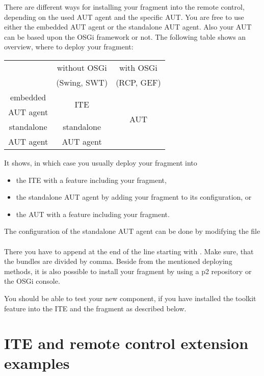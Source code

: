 There are different ways for installing your fragment into the remote
control, depending on the used AUT agent and the specific AUT. You are free to
use either the embedded AUT agent or the standalone AUT agent. Also your AUT
can be based upon the OSGi framework or not. The following table shows an
overview, where to deploy your fragment:

\begin{center}
\begin{tabular}{|c||c|c|}
\hline
~ & without OSGi & with OSGi\\
~ & (Swing, SWT) & (RCP, GEF)\\
\hline\hline
embedded & \multirow{2}{*}{ITE} & \multirow{4}{*}{AUT}\\
AUT agent & & \\
\hhline{--~}
standalone & standalone & \\
AUT agent  & AUT agent  & \\
\hline
\end{tabular}
\end{center}

It shows, in which case you usually deploy your fragment into
\begin{itemize}
  \item the ITE with a feature including your fragment,
  \item the standalone AUT agent by adding your fragment to its configuration,
        or
  \item the AUT with a feature including your fragment.
\end{itemize}

The configuration of the standalone AUT agent can be done by modifying the
file\\
\\
There you have to append  at the end of the
line starting with . Make sure, that the bundles are
divided by comma. Beside from the mentioned deploying methods, it is also
possible to install your fragment by using a p2 repository or the OSGi console.

You should be able to test your new component, if you have installed the
toolkit feature into the ITE and the fragment as described below.

\section{ITE and remote control extension examples}
\label{extensionExamples}

